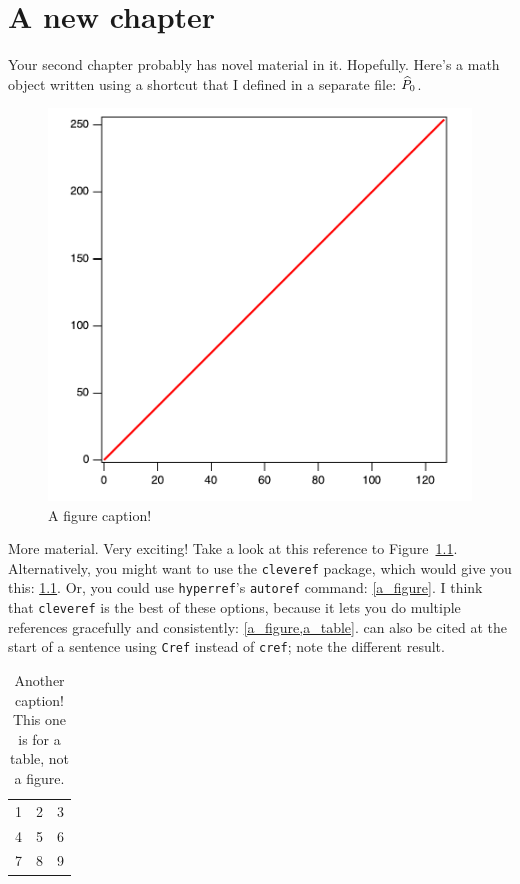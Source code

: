 \chapter{A new chapter} \label{chapter2}
Your second chapter probably has novel material in it. Hopefully. Here's a math object written using a shortcut that I defined in a separate file: $\widehat{P}_0$.





\begin{figure}[ht]
\centering
\includegraphics[width=.45\textwidth]{name_of_figure.pdf}
\caption[Short caption for the list of figures]{A figure caption!}
\label{a_figure}
\end{figure}

More material. Very exciting! Take a look at this reference to Figure~\ref{a_figure}.
Alternatively, you might want to use the \texttt{cleveref} package, which would give you this: \cref{a_figure}.
Or, you could use \texttt{hyperref}'s \texttt{autoref} command: \autoref{a_figure}.
I think that \texttt{cleveref} is the best of these options, because it lets you do multiple references gracefully and consistently: \cref{a_figure,a_table}.
 can also be cited at the start of a sentence using \texttt{Cref} instead of \texttt{cref}; note the different result.

\begin{table}
\centering
\begin{tabular}{c|c|c}
 1 & 2 & 3 \\
 4 & 5 & 6 \\
 7 & 8 & 9 \\
\hline
\end{tabular}
\caption[Short caption for the list of tables]{Another caption! This one is for a table, not a figure.}
\label{a_table}
\end{table}
